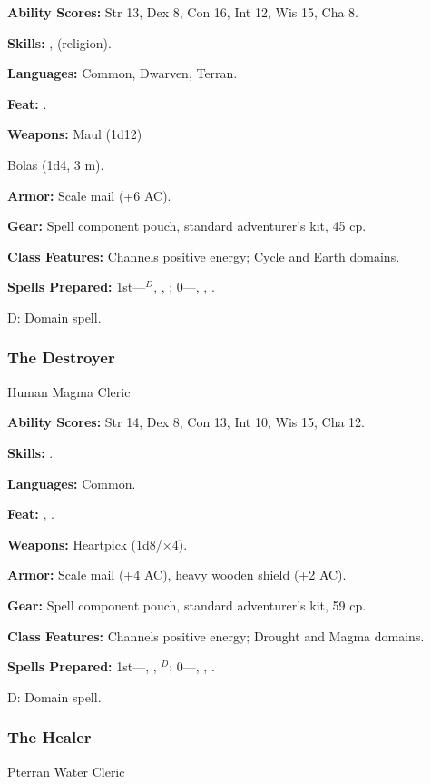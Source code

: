 \textbf{Ability Scores:} Str 13, Dex 8, Con 16, Int 12, Wis 15, Cha 8.

\textbf{Skills:} ,  (religion).

\textbf{Languages:} Common, Dwarven, Terran.

\textbf{Feat:} .

\textbf{Weapons:} Maul (1d12)

Bolas (1d4, 3 m).

\textbf{Armor:} Scale mail (+6 AC).

\textbf{Gear:} Spell component pouch, standard adventurer's kit, 45 cp.

\textbf{Class Features:} Channels positive energy; Cycle and Earth domains.

\textbf{Spells Prepared:} 1st---$^D$, , ; 0---, , .

D: Domain spell.

\subsubsection{The Destroyer}
Human Magma Cleric

\textbf{Ability Scores:} Str 14, Dex 8, Con 13, Int 10, Wis 15, Cha 12.

\textbf{Skills:} .

\textbf{Languages:} Common.

\textbf{Feat:} , .

\textbf{Weapons:} Heartpick (1d8/$\times$4).

\textbf{Armor:} Scale mail (+4 AC), heavy wooden shield (+2 AC).

\textbf{Gear:} Spell component pouch, standard adventurer's kit, 59 cp.

\textbf{Class Features:} Channels positive energy; Drought and Magma domains.

\textbf{Spells Prepared:} 1st---, , $^{D}$; 0---, , .

D: Domain spell.

\subsubsection{The Healer}
Pterran Water Cleric

